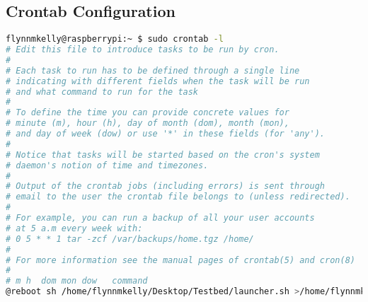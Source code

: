 \begin{appendices}
\section{Crontab Configuration}
\begin{lstlisting}[language=bash, caption={Crontab Configuration for Raspberry Pi}, label={lst:crontab}]
flynnmkelly@raspberrypi:~ $ sudo crontab -l
# Edit this file to introduce tasks to be run by cron.
# 
# Each task to run has to be defined through a single line
# indicating with different fields when the task will be run
# and what command to run for the task
# 
# To define the time you can provide concrete values for
# minute (m), hour (h), day of month (dom), month (mon),
# and day of week (dow) or use '*' in these fields (for 'any').
# 
# Notice that tasks will be started based on the cron's system
# daemon's notion of time and timezones.
# 
# Output of the crontab jobs (including errors) is sent through
# email to the user the crontab file belongs to (unless redirected).
# 
# For example, you can run a backup of all your user accounts
# at 5 a.m every week with:
# 0 5 * * 1 tar -zcf /var/backups/home.tgz /home/
# 
# For more information see the manual pages of crontab(5) and cron(8)
# 
# m h  dom mon dow   command
@reboot sh /home/flynnmkelly/Desktop/Testbed/launcher.sh >/home/flynnmkelly/logs/cronlog 2>&1
\end{lstlisting}




\end{appendices}